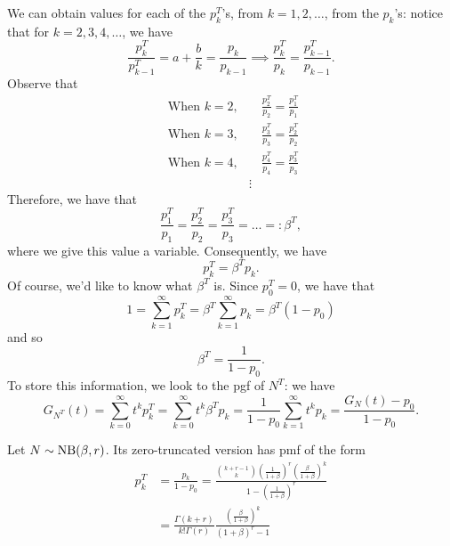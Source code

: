 \documentclass[notoc,notitlepage]{tufte-book}
\begin{document}
We can obtain values for each of the $p_k^T$'s, from $k = 1, 2, \ldots$, from the $p_k$'s: notice that for $k = 2, 3, 4, \ldots$, we have
\begin{equation*}
  \frac{p_k^T}{p_{k - 1}^T} = a + \frac{b}{k} = \frac{p_k}{p_{k - 1}} \implies \frac{p_k^T}{p_k} = \frac{p_{k - 1}^T}{p_{k - 1}}.
\end{equation*}
Observe that
\begin{align*}
  \text{ When } k = 2, &\quad \frac{p_2^T}{p_2} = \frac{p_1^T}{p_1} \\
  \text{ When } k = 3, &\quad \frac{p_3^T}{p_3} = \frac{p_2^T}{p_2} \\
  \text{ When } k = 4, &\quad \frac{p_4^T}{p_4} = \frac{p_3^T}{p_3} \\
                       &\vdots
\end{align*}
Therefore, we have that
\begin{equation*}
  \frac{p_1^T}{p_1} = \frac{p_2^T}{p_2} = \frac{p_3^T}{p_3} = \hdots =: \beta^T,
\end{equation*}
where we give this value a variable. Consequently, we have
\begin{equation*}
  p_k^T = \beta^T p_k.
\end{equation*}
Of course, we'd like to know what $\beta^T$ is. Since $p_0^T = 0$, we have that
\begin{equation*}
  1 = \sum_{k=1}^{\infty} p_k^T = \beta^T \sum_{k=1}^{\infty} p_k = \beta^T ( 1 - p_0 )
\end{equation*}
and so
\begin{equation*}
  \beta^T = \frac{1}{1 - p_0}.
\end{equation*}
To store this information, we look to the pgf of $N^T$: we have
\begin{equation*}
  G_{N^T}(t) = \sum_{k=0}^{\infty} t^k p_{k}^T= \sum_{k=0}^{\infty} t^k \beta^T p_k = \frac{1}{1 - p_0} \sum_{k=1}^{\infty} t^k p_k = \frac{G_N(t) - p_0}{1 - p_0}.
\end{equation*}

\begin{eg}
  Let $N \sim \operatorname{NB}(\beta, r)$. Its zero-truncated version has pmf of the form
  \begin{align*}
    p_k^T &= \frac{p_k}{1 - p_0} = \frac{\binom{k + r - 1}{k} \left( \frac{1}{1 + \beta} \right)^r \left( \frac{\beta}{1 + \beta} \right)^k}{1 - \left( \frac{1}{1 + \beta} \right)^r} \\
          &= \frac{\Gamma(k + r)}{k! \Gamma(r)} \frac{\left( \frac{\beta}{1 + \beta} \right)^k}{(1 + \beta)^r - 1}
  \end{align*}
\end{eg}
\end{document}
